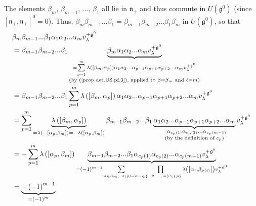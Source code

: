 \documentclass[etingof-lie.tex]{subfiles}
\begin{document}
The elements $\beta_{m}$, $\beta_{m-1}$, $...$, $\beta_{1}$ all lie in
$\mathfrak{n}_{+}$ and thus commute in $U\left(  \mathfrak{g}^{0}\right)  $
(since $\left[  \mathfrak{n}_{+},\mathfrak{n}_{+}\right]  ^{0}=0$). Thus,
$\beta_{m}\beta_{m-1}...\beta_{1}=\beta_{m-1}\beta_{m-2}...\beta_{1}\beta_{m}$
in $U\left(  \mathfrak{g}^{0}\right)  $, so that%
\begin{align*}
&  \beta_{m}\beta_{m-1}...\beta_{1}\alpha_{1}\alpha_{2}...\alpha_{m}%
v_{\lambda}^{+\mathfrak{g}^{0}}\\
&  =\beta_{m-1}\beta_{m-2}...\beta_{1}\underbrace{\beta_{m}\alpha_{1}%
\alpha_{2}...\alpha_{m}v_{\lambda}^{+\mathfrak{g}^{0}}}_{\substack{=\sum
\limits_{p=1}^{m}\lambda\left(  \left[  \beta_{m},\alpha_{p}\right]  \right)
\alpha_{1}\alpha_{2}...\alpha_{p-1}\alpha_{p+1}\alpha_{p+2}...\alpha
_{m}v_{\lambda}^{+\mathfrak{g}^{0}}\\\text{(by (\ref{prop.det.US.pf.3}),
applied to }\beta=\beta_{m}\text{ and }\ell=m\text{)}}}\\
&  =\beta_{m-1}\beta_{m-2}...\beta_{1}\sum\limits_{p=1}^{m}\lambda\left(
\left[  \beta_{m},\alpha_{p}\right]  \right)  \alpha_{1}\alpha_{2}%
...\alpha_{p-1}\alpha_{p+1}\alpha_{p+2}...\alpha_{m}v_{\lambda}^{+\mathfrak{g}%
^{0}}\\
&  =\sum\limits_{p=1}^{m}\underbrace{\lambda\left(  \left[  \beta_{m}%
,\alpha_{p}\right]  \right)  }_{=\lambda\left(  -\left[  \alpha_{p},\beta
_{m}\right]  \right)  =-\lambda\left(  \left[  \alpha_{p},\beta_{m}\right]
\right)  }\beta_{m-1}\beta_{m-2}...\beta_{1}\underbrace{\alpha_{1}\alpha
_{2}...\alpha_{p-1}\alpha_{p+1}\alpha_{p+2}...\alpha_{m}}_{\substack{=\alpha
_{c_{p}\left(  1\right)  }\alpha_{c_{p}\left(  2\right)  }...\alpha
_{c_{p}\left(  m-1\right)  }\\\text{(by the definition of }c_{p}\text{)}%
}}v_{\lambda}^{+\mathfrak{g}^{0}}\\
&  =-\sum\limits_{p=1}^{m}\lambda\left(  \left[  \alpha_{p},\beta_{m}\right]
\right)  \underbrace{\beta_{m-1}\beta_{m-2}...\beta_{1}\alpha_{c_{p}\left(
1\right)  }\alpha_{c_{p}\left(  2\right)  }...\alpha_{c_{p}\left(  m-1\right)
}v_{\lambda}^{+\mathfrak{g}^{0}}}_{=\left(  -1\right)  ^{m-1}\sum
\limits_{\sigma\in S_{m};\ \sigma\left(  p\right)  =m}\prod\limits_{i\in
\left\{  1,2,...,m\right\}  \diagdown\left\{  p\right\}  }\lambda\left(
\left[  \alpha_{i},\beta_{\sigma\left(  i\right)  }\right]  \right)
v_{\lambda}^{+\mathfrak{g}^{0}}}\\
&  =\underbrace{-\left(  -1\right)  ^{m-1}}_{=\left(  -1\right)  ^{m}}%

\end{align*}
\end{document}
